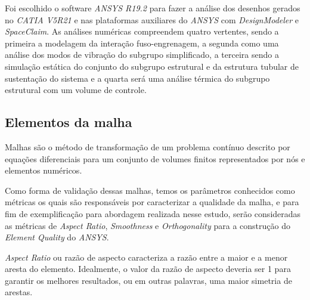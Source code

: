 Foi escolhido o software \textit{ANSYS R19.2} para fazer a análise dos desenhos gerados no \textit{CATIA V5R21} e nas plataformas auxiliares do \textit{ANSYS} com \textit{DesignModeler} e \textit{SpaceClaim}. As análises numéricas compreendem quatro vertentes, sendo a primeira a modelagem da interação fuso-engrenagem, a segunda como uma análise dos modos de vibração do subgrupo simplificado, a terceira sendo a simulação estática do conjunto do subgrupo estrutural e da estrutura tubular de sustentação do sistema e a quarta será uma análise térmica do subgrupo estrutural com um volume de controle.

\subsection{Elementos da malha}



Malhas são o método de transformação de um problema contínuo descrito por equações diferenciais para um conjunto de volumes finitos representados por nós e elementos numéricos.

Como forma de validação dessas malhas, temos os parâmetros conhecidos como métricas os quais são responsáveis por caracterizar a qualidade da malha, e para fim de exemplificação para abordagem realizada nesse estudo, serão consideradas as métricas de \textit{Aspect Ratio}, \textit{Smoothness} e \textit{Orthogonality} \cite{luiz_malha} para a construção do \textit{Element Quality} do \textit{ANSYS}.

\textit{Aspect Ratio} ou razão de aspecto caracteriza a razão entre a maior e a menor aresta do elemento. Idealmente, o valor da razão de aspecto deveria ser 1 para garantir os melhores resultados, ou em outras palavras, uma maior simetria de arestas.

